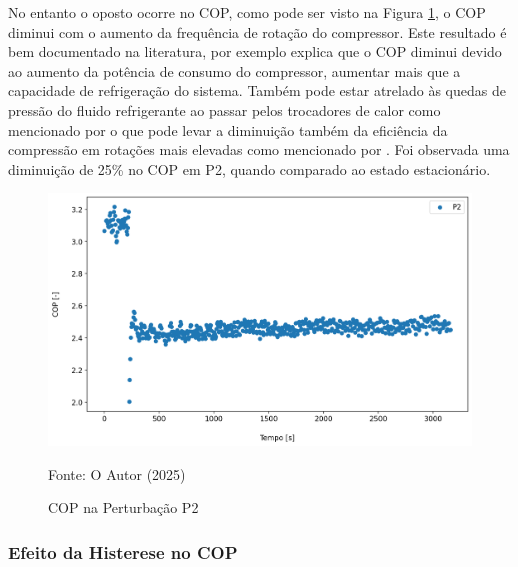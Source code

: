 No entanto o oposto ocorre no COP, como pode ser visto na Figura \ref{fig:Análise do COP Rotação}, o COP diminui com o aumento da frequência de rotação do compressor. Este resultado é bem documentado na literatura, por exemplo \textcite{MASCHE2021302} explica que o COP diminui devido ao aumento da potência de consumo do compressor, aumentar mais que a capacidade de refrigeração do sistema. Também pode estar atrelado às quedas de pressão do fluido refrigerante ao passar pelos trocadores de calor como mencionado por \textcite{CONSTANTINO2022101048} o que pode levar a diminuição também da eficiência da compressão em rotações mais elevadas como mencionado por \textcite{stoecker1998industrial}. Foi observada uma diminuição de 25\% no COP em P2, quando comparado ao estado estacionário.
\newpage
\begin{figure}[h]
    \centering
    \includegraphics[width=1\linewidth]{FigurasdoTexto/COP Perturbação Rot.png}
    \caption{COP na Perturbação P2}
    \label{fig:Análise do COP Rotação}
    {\footnotesize Fonte: O Autor (2025)}
\end{figure}

\subsubsection{Efeito da Histerese no COP}

